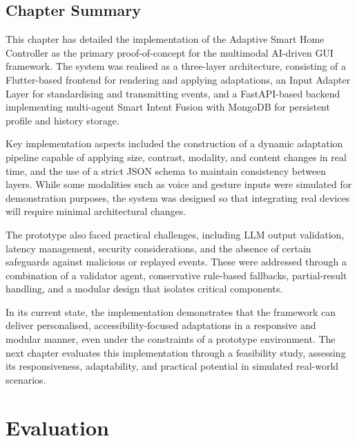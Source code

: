 \documentclass[openany]{book}
\begin{document}
\section{Chapter Summary}
This chapter has detailed the implementation of the Adaptive Smart Home Controller as the primary proof-of-concept for the multimodal AI-driven GUI framework. The system was realised as a three-layer architecture, consisting of a Flutter-based frontend for rendering and applying adaptations, an Input Adapter Layer for standardising and transmitting events, and a FastAPI-based backend implementing multi-agent Smart Intent Fusion with MongoDB for persistent profile and history storage.

Key implementation aspects included the construction of a dynamic adaptation pipeline capable of applying size, contrast, modality, and content changes in real time, and the use of a strict JSON schema to maintain consistency between layers. While some modalities such as voice and gesture inputs were simulated for demonstration purposes, the system was designed so that integrating real devices will require minimal architectural changes.

The prototype also faced practical challenges, including LLM output validation, latency management, security considerations, and the absence of certain safeguards against malicious or replayed events. These were addressed through a combination of a validator agent, conservative rule-based fallbacks, partial-result handling, and a modular design that isolates critical components.

In its current state, the implementation demonstrates that the framework can deliver personalised, accessibility-focused adaptations in a responsive and modular manner, even under the constraints of a prototype environment. The next chapter evaluates this implementation through a feasibility study, assessing its responsiveness, adaptability, and practical potential in simulated real-world scenarios.

\chapter{Evaluation}
\end{document}
